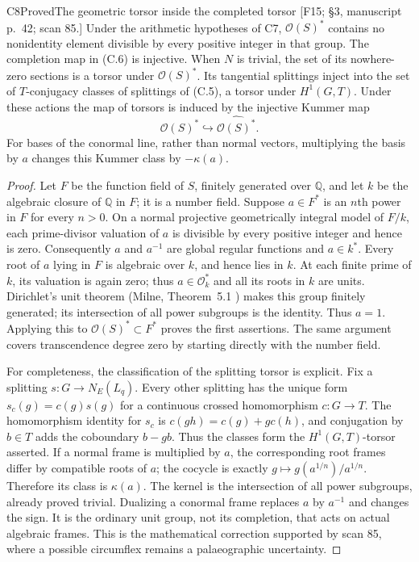 \begin{result}{C8}{Proved}{The geometric torsor inside the completed torsor}
\textup{[F15; \S3, manuscript p.\ 42; scan 85.]}
Under the arithmetic hypotheses of C7, $\mathcal O(S)^*$ contains no
nonidentity element divisible by every positive integer in that group.
The completion map in (C.6) is injective. When $N$ is trivial, the set
of its nowhere-zero sections is a torsor under $\mathcal O(S)^*$.
Its tangential splittings inject into the set of $T$-conjugacy classes
of splittings of (C.5), a torsor under $H^1(G,T)$. Under these actions
the map of torsors is induced by the injective Kummer map
\[
 \mathcal O(S)^*\hookrightarrow\widehat{\mathcal O(S)^*}.
\]
For bases of the conormal line, rather than normal vectors, multiplying
the basis by $a$ changes this Kummer class by $-\kappa(a)$.
\end{result}

\begin{proof}
Let $F$ be the function field of $S$, finitely generated over $\mathbb Q$,
and let $k$ be the algebraic closure of $\mathbb Q$ in $F$; it is a
number field. Suppose $a\in F^*$ is an $n$th power in $F$ for every
$n>0$. On a normal projective geometrically integral model of $F/k$,
each prime-divisor valuation of $a$ is divisible by every positive
integer and hence is zero. Consequently $a$ and $a^{-1}$ are global
regular functions and $a\in k^*$. Every root of $a$ lying in $F$ is
algebraic over $k$, and hence lies in $k$. At each finite prime of
$k$, its valuation is again zero; thus $a\in\mathcal O_k^*$ and all
its roots in $k$ are units. Dirichlet's unit theorem (Milne, Theorem~5.1 \cite{CF_MilneANT}) makes this group
finitely generated; its intersection of all power subgroups is the
identity. Thus $a=1$. Applying this to
$\mathcal O(S)^*\subset F^*$ proves the first assertions. The same
argument covers transcendence degree zero by starting directly with
the number field.

For completeness, the classification of the splitting torsor is
explicit. Fix a splitting $s:G\to N_E(L_q)$. Every other splitting
has the unique form $s_c(g)=c(g)s(g)$ for a continuous crossed
homomorphism $c:G\to T$. The homomorphism identity for $s_c$ is
$c(gh)=c(g)+g c(h)$, and conjugation by $b\in T$ adds the coboundary
$b-gb$. Thus the classes form the $H^1(G,T)$-torsor asserted. If a
normal frame is multiplied by $a$, the corresponding root frames
differ by compatible roots of $a$; the cocycle is exactly
$g\mapsto g(a^{1/n})/a^{1/n}$. Therefore its class is $\kappa(a)$.
The kernel is the intersection of all power subgroups, already proved
trivial. Dualizing a conormal frame replaces $a$ by $a^{-1}$ and
changes the sign. It is the ordinary unit group, not its completion,
that acts on actual algebraic frames. This is the mathematical
correction supported by scan 85, where a possible circumflex remains
a palaeographic uncertainty.
\end{proof}

